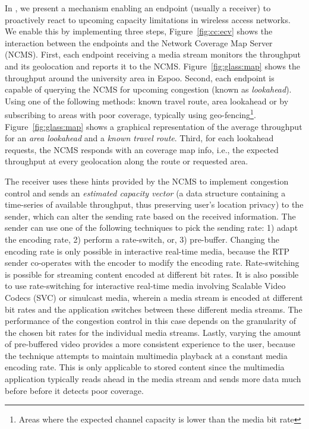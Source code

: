 In , we present a mechanism enabling an endpoint (usually a
receiver) to proactively react to upcoming capacity limitations in wireless
access networks. We enable this by implementing three steps,
Figure~\ref{fig:cc:ecv} shows the interaction between the endpoints and the
Network Coverage Map Server (NCMS). First, each endpoint receiving a media
stream monitors the throughput and its geolocation and reports it to the NCMS.
Figure~\ref{fig:glass:map} shows the throughput around the university area in
Espoo. Second, each endpoint is capable of querying the NCMS for upcoming
congestion (known as \emph{lookahead}). Using one of
the following methods: known travel route, area lookahead or by subscribing to
areas with poor coverage, typically using geo-fencing\footnote{Areas where the
expected channel capacity is lower than the media bit rate}.
Figure~\ref{fig:glass:map} shows a graphical representation of the average
throughput for an \emph{area lookahead} and a \emph{known travel route}. Third,
for each lookahead requests, the NCMS responds with an coverage map info,
i.e., the expected throughput at every geolocation along the route or
requested area.


The receiver uses these hints provided by the NCMS to implement congestion
control and sends an \emph{estimated capacity vector} (a data structure
containing a time-series of available throughput, thus preserving user's
location privacy) to the sender, which can alter the sending rate based on the
received information. The sender can use one of the following techniques to pick the
sending rate: 1) adapt the encoding rate, 2) perform a rate-switch, or, 3)
pre-buffer. Changing the encoding rate is only possible in interactive
real-time media, because the RTP sender co-operates with the encoder to  modify the
encoding rate. Rate-switching is possible for streaming content  encoded at
different bit rates. It is also possible to use rate-switching  for
interactive real-time media involving Scalable Video Codecs (SVC) or simulcast
media, wherein a media stream is encoded at different bit rates and the
application switches between these different media streams. The performance of the
congestion control in this case depends on the granularity of the chosen bit
rates for the individual media streams. Lastly, varying the amount of
pre-buffered video provides a more consistent experience to the user,  because the
technique attempts to maintain multimedia playback at a constant media
encoding rate. This is only applicable to stored content since the multimedia
application typically reads ahead in the media stream and sends more data
much before before it detects poor coverage.

